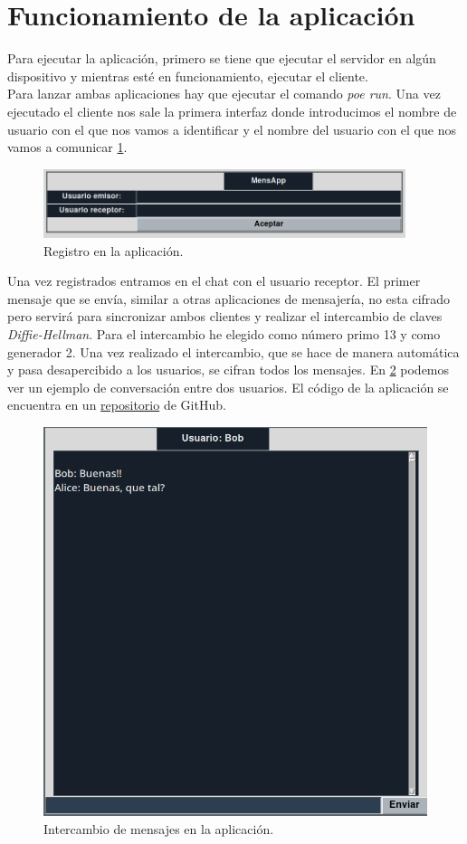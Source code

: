 \section{Funcionamiento de la aplicación}
Para ejecutar la aplicación, primero se tiene que ejecutar el servidor en algún dispositivo y mientras esté en funcionamiento, ejecutar el cliente.\\
Para lanzar ambas aplicaciones hay que ejecutar el comando \emph{poe run}. Una vez ejecutado el cliente nos sale la primera interfaz donde introducimos el nombre de usuario con el que nos vamos a identificar y el nombre del usuario con el que nos vamos a comunicar \ref{appprimeraparte}.

\begin{figure}[thb]
	\centering
	\includegraphics[width=400]{imagenes/mensapp1.png} 
	\caption{Registro en la aplicación.}
	\label{appprimeraparte}
\end{figure}
\newpage
Una vez registrados entramos en el chat con el usuario receptor. El primer mensaje que se envía, similar a otras aplicaciones de mensajería, no esta cifrado pero servirá para sincronizar ambos clientes y realizar el intercambio de claves \emph{Diffie-Hellman}. Para el intercambio he elegido como número primo 13 y como generador 2.  Una vez realizado el intercambio, que se hace de manera automática y pasa desapercibido a los usuarios, se cifran todos los mensajes. En \ref{appsegundaparte} podemos ver un ejemplo de conversación entre dos usuarios. El código de la aplicación se encuentra en un \href{https://github.com/luistf24/MensApp-TFG}{repositorio} de GitHub.
\begin{figure}[hbt]
	\centering
	\includegraphics[scale=0.45]{imagenes/mensapp2.png} 
	\caption{Intercambio de mensajes en la aplicación.}
	\label{appsegundaparte}
\end{figure}
